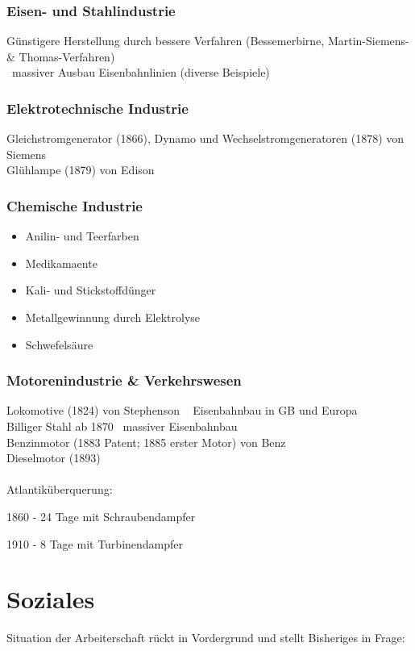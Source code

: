 \documentclass{report}
\begin{document}
\subsubsection{Eisen- und Stahlindustrie}
Günstigere Herstellung durch bessere Verfahren (Bessemerbirne, Martin-Siemens- \& Thomas-Verfahren)\\
\arrow~massiver Ausbau Eisenbahnlinien (diverse Beispiele)

\subsubsection{Elektrotechnische Industrie}
Gleichstromgenerator (1866), Dynamo und Wechselstromgeneratoren (1878) von Siemens\\
Glühlampe (1879) von Edison

\subsubsection{Chemische Industrie}
\begin{itemize}
	\item Anilin- und Teerfarben
	\item Medikamaente
	\item Kali- und Stickstoffdünger
	\item Metallgewinnung durch Elektrolyse
	\item Schwefelsäure
\end{itemize}

\subsubsection{Motorenindustrie \& Verkehrswesen}
Lokomotive (1824) von Stephenson \arrow~ Eisenbahnbau in GB und Europa\\
Billiger Stahl ab 1870 \arrow~massiver Eisenbahnbau\\
Benzinmotor (1883 Patent; 1885 erster Motor) von Benz\\
Dieselmotor (1893)\\\\
Atlantiküberquerung:\par
1860 - 24 Tage mit Schraubendampfer\par
1910 - 8 Tage mit Turbinendampfer
\newpage

\section{Soziales}
Situation der Arbeiterschaft rückt in Vordergrund und stellt Bisheriges in Frage:
\end{document}
